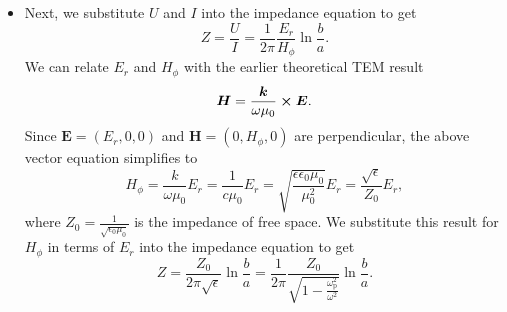 \documentclass[11pt, a4paper]{article}
\renewcommand{\vec}[1]{\bm{#1}} %
\newcommand{\E}{\vec{E}}  %
\renewcommand{\H}{\vec{H}}  %
\newcommand{\e}{\epsilon}
\newcommand{\ee}{\epsilon_{0}}  %
\newcommand{\mm}{\mu_{0}}  %
\newcommand{\m}{\vec{m}}  %
\begin{document}
\begin{itemize}
	\item Next, we substitute $ U $ and $ I $ into the impedance equation to get
	\begin{equation*}
		Z = \frac{U}{I} = \frac{1}{2\pi}\frac{E_{r}}{H_{\phi}}\ln \frac{b}{a}.
	\end{equation*}
	We can relate $ E_{r} $ and $ H_{\phi} $ with the earlier theoretical TEM result 
	\begin{equation*}
		\H = \frac{\vec{k}}{\omega \mm} \cross \E.
	\end{equation*}
	Since $ \E = (E_{r}, 0, 0) $ and $ \H = (0, H_{\phi}, 0) $ are perpendicular, the above vector equation simplifies to
	\begin{equation*}
		H_{\phi} = \frac{k}{\omega \mm}E_{r} = \frac{1}{c\mm} E_{r} = \sqrt{\frac{\e \ee \mm}{\mm^{2}}}E_{r} =  \frac{\sqrt{\e}}{Z_{0}} E_{r},
	\end{equation*}
    where $ Z_{0} = \frac{1}{\sqrt{\ee\mm}} $ is the impedance of free space. We substitute this result for $ H_{\phi} $ in terms of $ E_{r} $ into the impedance equation to get
	\begin{equation*}
		Z = \frac{Z_{0}}{2\pi \sqrt{\e}} \ln \frac{b}{a} = \frac{1}{2\pi}\frac{Z_{0}}{\sqrt{1 - \frac{\omega_{\text{p}}^{2}}{\omega^{2}}}}\ln \frac{b}{a}.
	\end{equation*}
	
\end{itemize}
\end{document}
